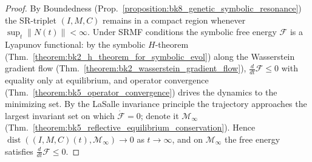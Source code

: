 \begin{proof}
\label{proof:bk8_sr_convergence}
\leavevmode
By Boundedness (Prop.~\ref{proposition:bk8_genetic_symbolic_resonance}) the SR-triplet $(I,M,C)$ remains in a compact region whenever $\sup_t\|N(t)\|<\infty$. Under SRMF conditions the symbolic free energy $\mathcal{F}$ is a Lyapunov functional: by the symbolic $H$-theorem (Thm.~\ref{theorem:bk2_h_theorem_for_symbolic_evol}) along the Wasserstein gradient flow (Thm.~\ref{theorem:bk2_wasserstein_gradient_flow}), $\tfrac{d}{dt}\mathcal{F}\le 0$ with equality only at equilibrium, and operator convergence (Thm.~\ref{theorem:bk5_operator_convergence}) drives the dynamics to the minimizing set. By the LaSalle invariance principle the trajectory approaches the largest invariant set on which $\dot{\mathcal F}=0$; denote it $\mathcal{M}_\infty$ (Thm.~\ref{theorem:bk5_reflective_equilibrium_conservation}). Hence $\operatorname{dist}((I,M,C)(t),\mathcal{M}_\infty)\to 0$ as $t\to\infty$, and on $\mathcal{M}_\infty$ the free energy satisfies $\tfrac{d}{dt}\mathcal{F}\le 0$.
\end{proof}

